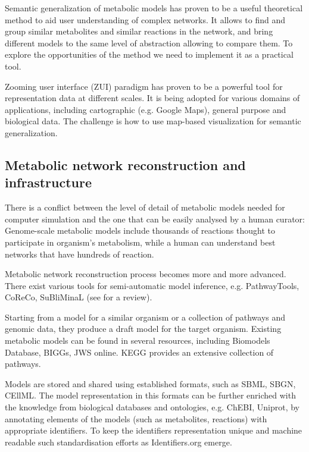 \documentclass{bmcart}
\begin{document}
Semantic generalization of metabolic models\cite{Zhukova2014} has proven to be a useful theoretical method to aid user understanding of complex networks. It allows to find and group similar metabolites and similar reactions in the network, and bring different models to the same level of abstraction allowing to compare them. 
To explore the opportunities of the method we need to implement it as a practical tool.

Zooming user interface (ZUI)\cite{Bederson1998} paradigm has proven to be a powerful tool for representation data at different scales. It is being adopted for various domains of applications, including cartographic (e.g. Google Maps), general purpose and biological data. The challenge is how to use map-based visualization for semantic generalization.

\subsection*{Metabolic network reconstruction and infrastructure}
There is a conflict between the level of detail of metabolic models needed for computer simulation and the one that can be easily analysed by a human curator: Genome-scale metabolic models include thousands of reactions thought to participate in organism's metabolism, while a human can understand best networks that have hundreds of reaction.

Metabolic network reconstruction process becomes more and more advanced. There exist various tools for semi-automatic model inference, e.g. PathwayTools\cite{Karp2002}, CoReCo\cite{Pitkanen2014}, SuBliMinaL\cite{Swainston2011} (see \cite{Hamilton2014} for a review).

Starting from a model for a similar organism or a collection of pathways and genomic data, they produce a draft model for the target organism. Existing metabolic models can be found in several resources, including Biomodels Database\cite{Li10}, BIGGs\cite{Schellenberger2010}, JWS online\cite{Snoep2003}. KEGG\cite{Kanehisa12} provides an extensive collection of pathways. 

Models are stored and shared using established formats, such as SBML\cite{Hucka2003}, SBGN\cite{Moodie2011}, CEllML\cite{Lloyd2004}. The model representation in this formats can be further enriched with the knowledge from biological databases and ontologies, e.g. ChEBI\cite{deMatos10}, Uniprot\cite{TheUniProtConsortium2013}, by annotating elements of the models (such as metabolites, reactions) with appropriate identifiers. To keep the identifiers representation unique and machine readable such standardisation efforts as Identifiers.org\cite{Juty2012} emerge.
\end{document}
